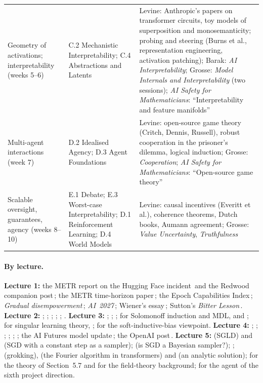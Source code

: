 \begin{tabular}{@{}>{\raggedright\arraybackslash}p{27mm}>{\raggedright\arraybackslash}p{37mm}>{\raggedright\arraybackslash}p{55mm}@{}}
Geometry of activations; interpretability (weeks 5--6) & C.2 Mechanistic Interpretability; C.4 Abstractions and Latents & Levine: Anthropic's papers on transformer circuits, toy models of superposition and monosemanticity; probing and steering (Burns et al., representation engineering, activation patching); Barak: \emph{AI Interpretability}; Grosse: \emph{Model Internals and Interpretability} (two sessions); \emph{AI Safety for Mathematicians}: ``Interpretability and feature manifolds''\\
Multi-agent interactions (week 7) & D.2 Idealised Agency; D.3 Agent Foundations & Levine: open-source game theory (Critch, Dennis, Russell), robust cooperation in the prisoner's dilemma, logical induction; Grosse: \emph{Cooperation}; \emph{AI Safety for Mathematicians}: ``Open-source game theory''\\
Scalable oversight, guarantees, agency (weeks 8--10) & E.1 Debate; E.3 Worst-case Interpretability; D.1 Reinforcement Learning; D.4 World Models & Levine: causal incentives (Everitt et al.), coherence theorems, Dutch books, Aumann agreement; Grosse: \emph{Value Uncertainty}, \emph{Truthfulness}\\
\bottomrule
\end{tabular}
\normalsize

\paragraph{By lecture\dagmark.} \textbf{Lecture 1:} the METR report on the Hugging Face incident\,\citep{metr2026} and the Redwood companion post\,\citep{redwood2026}; the METR time-horizon paper\,\citep{kwa2025}; the Epoch Capabilities Index\,\citep{epoch2025eci}; \emph{Gradual disempowerment}\,\citep{kulveit2025}; \emph{AI~2027}\,\citep{aifutures2025}; Wiener's essay\,\citep{wiener1960}; Sutton's \emph{Bitter Lesson}\,\citep{sutton2019}.
\textbf{Lecture 2:} \citet{kaplan2020}; \citet{hoffmann2022}; \citet{jacot2018}; \citet{chizat2019}; \citet{bahri2024}; \citet{bordelon2025}.
\textbf{Lecture 3:} \citet{zhang2017}; \citet{sharma2022}; \citet{fortmannroe2012}; for Solomonoff induction and MDL, \citet{li2019} and \citet{grunwald2007}; for singular learning theory, \citet{watanabe2009,watanabe2018}; \citet{wilson2025} for the soft-inductive-bias viewpoint.
\textbf{Lecture 4:} \citet{jones1995}; \citet{bloom2020}; \citet{ho2024}; \citet{besiroglu2024}; \citet{whitfill2025}; \citet{davidson2025}; the AI Futures model update\,\citep{aifutures2025dec}; the OpenAI post\,\citep{openai2026ra}.
\textbf{Lecture 5:} \citet{welling2011} (SGLD) and \citet{mandt2017} (SGD with a constant step as a sampler); \citet{mingard2021} (is SGD a Bayesian sampler?); \citet{neal1996}; \citet{power2022} (grokking), \citet{nanda2023} (the Fourier algorithm in transformers) and \citet{gromov2023} (an analytic solution); \citet{rubin2024} for the theory of Section~5.7 and \citet{ringel2025} for the field-theory background; \citet{hutter2005} for the agent of the sixth project direction.

